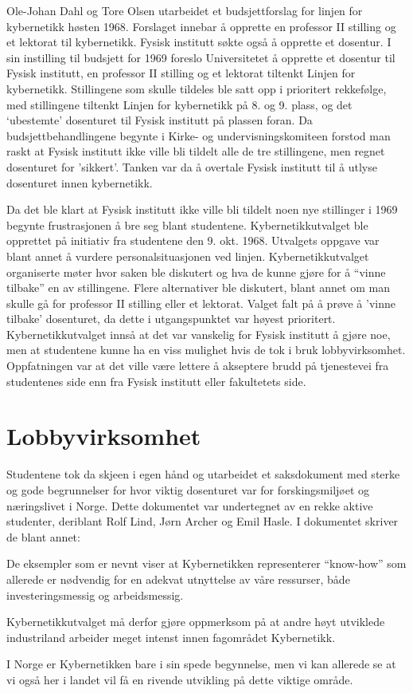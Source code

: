 Ole-Johan Dahl og Tore Olsen utarbeidet et budsjettforslag for linjen for kybernetikk høsten 1968. Forslaget innebar å opprette en professor II stilling og et lektorat til kybernetikk. Fysisk institutt søkte også å opprette et dosentur. I sin instilling til budsjett for 1969 foreslo Universitetet å opprette et dosentur til Fysisk institutt, en professor II stilling og et lektorat tiltenkt Linjen for kybernetikk. Stillingene som skulle tildeles ble satt opp i prioritert rekkefølge, med stillingene tiltenkt Linjen for kybernetikk på 8. og 9. plass, og det `ubestemte' dosenturet til Fysisk institutt på plassen foran. Da budsjettbehandlingene begynte i Kirke- og undervisningskomiteen forstod man raskt at Fysisk institutt ikke ville bli tildelt alle de tre stillingene, men regnet dosenturet for 'sikkert'. Tanken var da å overtale Fysisk institutt til å utlyse dosenturet innen kybernetikk.

Da det ble klart at Fysisk institutt ikke ville bli tildelt noen nye stillinger i 1969 begynte frustrasjonen å bre seg blant studentene. Kybernetikkutvalget ble opprettet på initiativ fra studentene den 9. okt. 1968. Utvalgets oppgave var blant annet å vurdere personalsituasjonen ved linjen. Kybernetikkutvalget organiserte møter hvor saken ble diskutert og hva de kunne gjøre for å ``vinne tilbake'' en av stillingene. Flere alternativer ble diskutert, blant annet om man skulle gå for professor II stilling eller et lektorat. Valget falt på å prøve å 'vinne tilbake' dosenturet, da dette i utgangspunktet var høyest prioritert. Kybernetikkutvalget innså at det var vanskelig for Fysisk institutt å gjøre noe, men at studentene kunne ha en viss mulighet hvis de tok i bruk lobbyvirksomhet. Oppfatningen var at det ville være lettere å akseptere brudd på tjenestevei fra studentenes side enn fra Fysisk institutt eller fakultetets side.

\section{Lobbyvirksomhet}

Studentene tok da skjeen i egen hånd og utarbeidet et saksdokument med sterke og gode begrunnelser for hvor viktig dosenturet var for forskingsmiljøet og næringslivet i Norge. Dette dokumentet var undertegnet av en rekke aktive studenter, deriblant Rolf Lind, Jørn Archer og Emil Hasle. I dokumentet skriver de blant annet:

\begin{displayquote}
	De eksempler som er nevnt viser at Kybernetikken representerer ``know-how'' som allerede er nødvendig for en adekvat utnyttelse av våre ressurser, både investeringsmessig og arbeidsmessig.

	Kybernetikkutvalget må derfor gjøre oppmerksom på at andre høyt utviklede industriland arbeider meget intenst innen fagområdet Kybernetikk.

	I Norge er Kybernetikken bare i sin spede begynnelse, men vi kan allerede se at vi også her i landet vil få en rivende utvikling på dette viktige område.
\end{displayquote}

